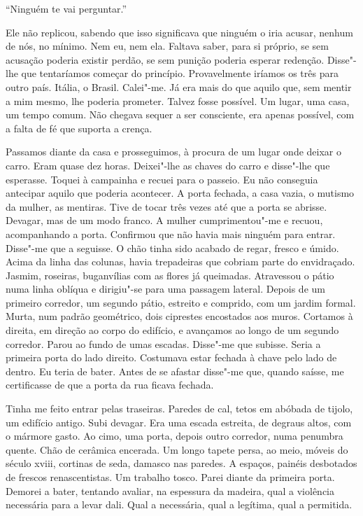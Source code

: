 ``Ninguém te vai perguntar.''

Ele não replicou, sabendo que isso significava que ninguém o iria
acusar, nenhum de nós, no mínimo. Nem eu, nem ela. Faltava saber, para
si próprio, se sem acusação poderia existir perdão, se sem punição
poderia esperar redenção. Disse"-lhe que tentaríamos começar do
princípio. Provavelmente iríamos os três para outro país. Itália, o
Brasil. Calei"-me. Já era mais do que aquilo que, sem mentir a mim
mesmo, lhe poderia prometer. Talvez fosse possível. Um lugar, uma casa,
um tempo comum. Não chegava sequer a ser consciente, era apenas
possível, com a falta de fé que suporta a crença.

Passamos diante da casa e prosseguimos, à procura de um lugar onde
deixar o carro. Eram quase dez horas. Deixei"-lhe as chaves do carro e
disse"-lhe que esperasse. Toquei à campainha e recuei para o passeio. Eu
não conseguia antecipar aquilo que poderia acontecer. A porta fechada, a
casa vazia, o mutismo da mulher, as mentiras. Tive de tocar três vezes
até que a porta se abrisse. Devagar, mas de um modo franco. A mulher
cumprimentou"-me e recuou, acompanhando a porta. Confirmou que não havia
mais ninguém para entrar. Disse"-me que a seguisse. O chão tinha sido
acabado de regar, fresco e úmido. Acima da linha das colunas, havia
trepadeiras que cobriam parte do envidraçado. Jasmim, roseiras,
buganvílias com as flores já queimadas. Atravessou o pátio numa linha
oblíqua e dirigiu"-se para uma passagem lateral. Depois de um primeiro
corredor, um segundo pátio, estreito e comprido, com um jardim formal.
Murta, num padrão geométrico, dois ciprestes encostados aos muros.
Cortamos à direita, em direção ao corpo do edifício, e avançamos ao
longo de um segundo corredor. Parou ao fundo de umas escadas. Disse"-me
que subisse. Seria a primeira porta do lado direito. Costumava estar
fechada à chave pelo lado de dentro. Eu teria de bater. Antes de se
afastar disse"-me que, quando saísse, me certificasse de que a porta da
rua ficava fechada.

Tinha me feito entrar pelas traseiras. Paredes de cal, tetos em
abóbada de tijolo, um edifício antigo. Subi devagar. Era uma escada
estreita, de degraus altos, com o mármore gasto. Ao cimo, uma porta,
depois outro corredor, numa penumbra quente. Chão de cerâmica encerada.
Um longo tapete persa, ao meio, móveis do século xviii, cortinas de
seda, damasco nas paredes. A espaços, painéis desbotados de frescos
renascentistas. Um trabalho tosco. Parei diante da primeira porta.
Demorei a bater, tentando avaliar, na espessura da madeira, qual a
violência necessária para a levar dali. Qual a necessária, qual a
legítima, qual a permitida.

